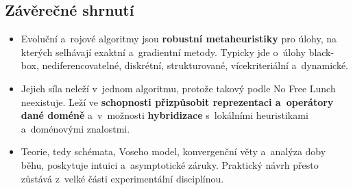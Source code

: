\documentclass[11pt,a4paper]{article}
\theoremstyle{definition}
\begin{document}
\subsection*{Závěrečné shrnutí}

\begin{itemize}
\item Evoluční a~rojové algoritmy jsou \textbf{robustní metaheuristiky} pro úlohy, na kterých
  selhávají exaktní a~gradientní metody. Typicky jde o~úlohy black-box,
  nedi\-fe\-ren\-co\-va\-tel\-né, diskrétní, struk\-tu\-ro\-va\-né,
  ví\-ce\-kri\-te\-ri\-ál\-ní a~dynamické.
\item Jejich síla neleží v~jednom  algoritmu, protože takový podle No Free Lunch
  neexistuje. Leží ve \textbf{schopnosti přizpůsobit reprezentaci a~operátory dané doméně}
  a~v~možnosti \textbf{hybridizace} s~lokálními heuristikami a~doménovými znalostmi.
\item Teorie, tedy schémata, Voseho model, konvergenční věty a~analýza doby běhu, poskytuje
  intuici a~a\-sym\-pto\-tic\-ké záruky. Praktický návrh přesto zůstává z~velké části
  ex\-pe\-ri\-men\-tál\-ní dis\-cip\-lí\-nou.
\end{itemize}
\end{document}
